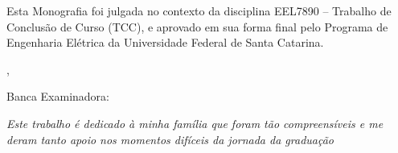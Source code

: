 \documentclass[a5paper,english,spanish,brazil]{ufsc-thesis}
\begin{document}
\begin{folhadeaprovacao}

  \begin{center}
    {\imprimirautor}

    \vspace*{\fill}\vspace*{\fill}
    \begin{center}
      \ABNTEXchapterfont\bfseries\Large\imprimirtitulo
    \end{center}
    \vspace*{\fill}
    
    
    	\begin{center}
    		\vspace*{0.5cm}
    		Esta Monografia foi julgada no contexto da disciplina EEL7890 -- Trabalho de Conclusão de Curso (TCC), e aprovado em sua forma final pelo Programa de Engenharia Elétrica da Universidade Federal de Santa Catarina.
    		\vspace*{0.5cm}
  		\end{center}
    
    \vspace*{\fill}
   \end{center}
  
  \begin{center}
    {\large\imprimirlocal},
    {\large\imprimirdata}
  \end{center}
        
   Banca Examinadora:
      

\end{folhadeaprovacao}

\begin{dedicatoria}
   \vspace*{\fill}
   \centering
   \noindent
   \textit{Este trabalho é dedicado à minha família que foram tão compreensíveis e me deram tanto apoio nos momentos difíceis da jornada da graduação} \vspace*{\fill}
\end{dedicatoria}
\end{document}
